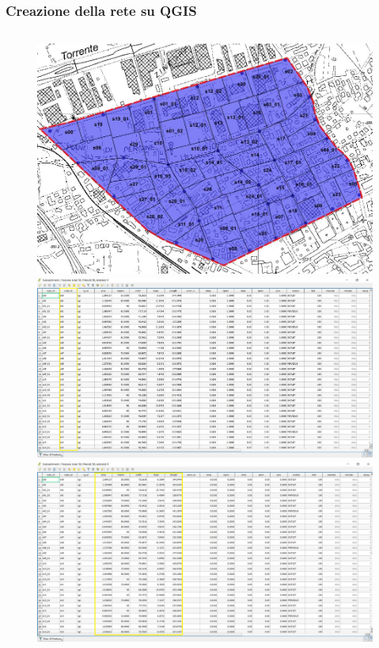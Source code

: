 \documentclass{beamer}
\begin{document}
\begin{frame}
 \frametitle{Creazione della rete su QGIS}
 
 \begin{columns}
  \begin{column}{.5\textwidth}
   \begin{figure}
    \centering  
    \begin{overprint}
     \includegraphics[width=\linewidth]{images/subcatchments}
      \includegraphics[width=\linewidth]{images/subcatchments_properties}
      \includegraphics[width=\linewidth]{images/subcatchments_geometry}
    \end{overprint}
   \end{figure}
  \end{column}
  

\end{columns}
\end{frame}
\end{document}
